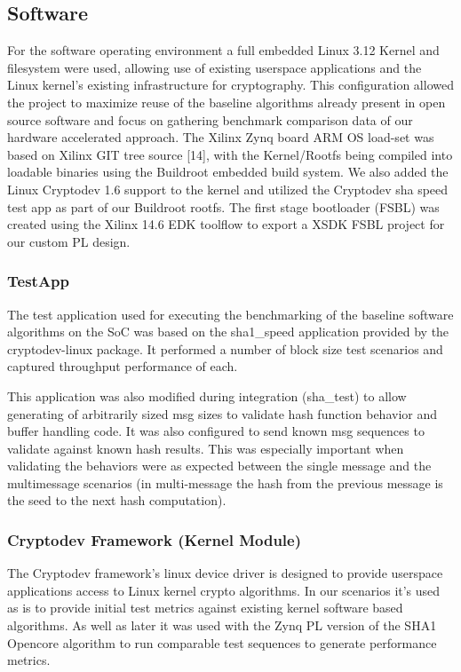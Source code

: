 \documentclass[journal]{IEEEtran}
\begin{document}
\subsection{Software}
For the software operating environment a full embedded Linux 3.12 Kernel and filesystem were used, allowing use of existing userspace applications and the Linux kernel’s existing infrastructure for cryptography.\cite{WIKPE2013} \cite{OCF2013} This configuration allowed the project to maximize reuse of the baseline algorithms already present in open source software and focus on gathering benchmark comparison data of our hardware accelerated approach.  The Xilinx Zynq board ARM OS load-set was based on Xilinx GIT tree source [14], with the Kernel/Rootfs being compiled into loadable binaries using the Buildroot \cite{BUILDROOT2013} embedded build system. We also added the Linux Cryptodev 1.6 support to the kernel and utilized the Cryptodev sha speed test app as part of our Buildroot rootfs.  The first stage bootloader (FSBL) was created using the Xilinx 14.6 EDK toolflow to export a XSDK FSBL project for our custom PL design.
\subsubsection{TestApp}
The test application used for executing the benchmarking of the baseline software algorithms on the SoC was based on the sha1\_speed application provided by the cryptodev-linux package.  It performed a number of block size test scenarios and captured throughput performance of each.

This application was also modified during integration (sha\_test) to allow generating of arbitrarily sized msg sizes to validate hash function behavior and buffer handling code.  It was also configured to send known msg sequences to validate against known hash results.  This was especially important when validating the behaviors were as expected between the single message and the multimessage scenarios (in multi-message the hash from the previous message is the seed to the next hash computation).
\subsubsection{Cryptodev Framework (Kernel Module)}
The Cryptodev framework’s linux device driver is designed to provide userspace applications access to Linux kernel crypto algorithms.  In our scenarios it’s used as is to provide initial test metrics against existing kernel software based algorithms.  As well as later it was used with the Zynq PL version of the SHA1 Opencore algorithm to run comparable test sequences to generate performance metrics.
\end{document}
